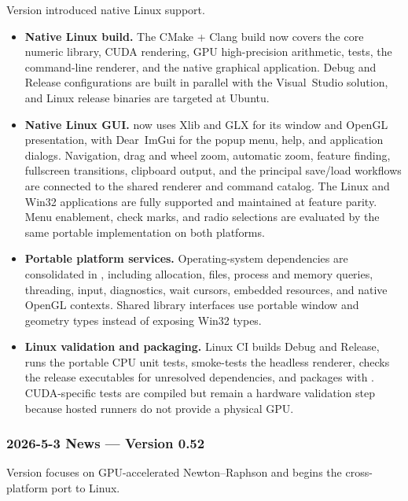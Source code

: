 Version  introduced native Linux support.

\begin{itemize}
\item \textbf{Native Linux build.} The CMake + Clang build now covers the core
  numeric library, CUDA rendering, GPU high-precision arithmetic, tests, the
  command-line renderer, and the native graphical application. Debug and
  Release configurations are built in parallel with the Visual~Studio
  solution, and Linux release binaries are targeted at Ubuntu.

\item \textbf{Native Linux GUI.}  now uses Xlib and
  GLX for its window and OpenGL presentation, with Dear~ImGui for the popup
  menu, help, and application dialogs. Navigation,
  drag and wheel zoom, automatic zoom, feature finding, fullscreen transitions,
  clipboard output, and the principal save/load workflows are connected to the
  shared renderer and command catalog. The Linux and Win32 applications are
  fully supported and maintained at feature parity. Menu enablement, check
  marks, and radio selections are evaluated by the same portable implementation
  on both platforms.

\item \textbf{Portable platform services.} Operating-system dependencies are
  consolidated in , including allocation, files,
  process and memory queries, threading, input, diagnostics, wait cursors,
  embedded resources, and native OpenGL contexts. Shared library interfaces use
  portable window and geometry types instead of exposing Win32 types.

\item \textbf{Linux validation and packaging.} Linux CI builds Debug and
  Release, runs the portable CPU unit tests, smoke-tests the headless renderer,
  checks the release executables for unresolved dependencies, and packages
   with . CUDA-specific tests
  are compiled but remain a hardware validation step because hosted runners do
  not provide a physical GPU.
\end{itemize}

\subsubsection{2026-5-3 News --- Version 0.52}

Version  focuses on GPU-accelerated Newton--Raphson and begins the
cross-platform port to Linux.

